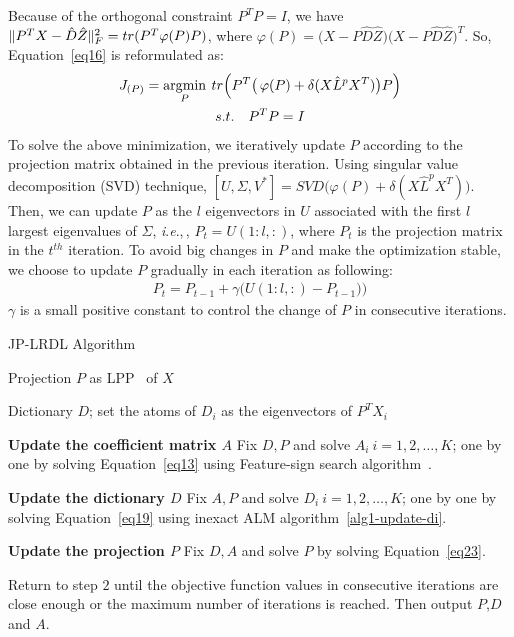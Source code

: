 \documentclass[journal]{IEEEtran}
\makeatletter
\newcommand{\ie}{\textit{i}.\textit{e}.,\,}
\def\NoNumber#1{{\def\alglinenumber##1{}\State #1}\addtocounter{ALG@line}{-1}}
\DeclareMathOperator*{\argmin}{\arg\!\min}
\DeclarePairedDelimiter\norm{\lVert}{\rVert}
\makeatother
\begin{document}
Because of the orthogonal constraint $P^T P = I$, we have $\norm{P^T X - \hat{D} \hat{Z}}_{F}^2 = tr(P^T \varphi(P) P) $, where $\varphi(P) = \big( X - P \hat{D} \hat{Z} \big) \big( X - P \hat{D} \hat{Z} \big)^T $. So, Equation~\eqref{eq16} is reformulated as:
\begin{gather}
J_{(P)} = \argmin_{P}  \> tr \Big( P^T \big( \, \varphi(P)+ \delta (X \hat{L}^{p} X^T) \big) P \Big) 
\label{eq22} \\ \notag
s.t. \quad P^T P = I
\end{gather}
To solve the above minimization, we iteratively update $P$ according to the projection matrix obtained in the previous iteration. Using singular value decomposition (SVD) technique, $[U,\Sigma,V^*] =  SVD \big( \varphi(P)+ \delta (X \hat{L}^{p} X^T) \big)$. Then, we can update $P$ as the $l$ eigenvectors in $U$ associated with the first $l$ largest eigenvalues of $\Sigma$, \ie, $P_t = U(1:l,:)$,  where $P_t$ is the projection matrix in the $t^{th}$ iteration. To avoid big changes in $P$ and make the optimization stable, we choose to update $P$ gradually in each iteration as following:
\begin{gather}
P_t =  P_{t-1} + \gamma \Big( U(1:l,:) - P_{t-1}) \Big) 
\label{eq23}
\end{gather}
$\gamma$ is a small positive constant to control the change of $P$ in consecutive iterations.
\begin{algorithm}[h]
\footnotesize
\caption{JP-LRDL Algorithm}
\label{alg2-whole}
\begin{algorithmic}[1]
\renewcommand{\algorithmicrequire}{\textbf{Input:}}
\Initialize 
\NoNumber{Projection $P$ as LPP~\cite{LPP} of $X$}
\NoNumber{Dictionary $D$; set the atoms of $D_i$ as the eigenvectors of $P^T X_i$}
    \vspace{1mm}    
    \State \textbf{Update the coefficient matrix $A$} 
    \vspace{1mm}
    \NoNumber{Fix $D,P$ and solve $A_i \> i=1,2, \dots, K$; one by one by solving Equation~\eqref{eq13} using Feature-sign search algorithm~\cite{Feature-Sign}.}
    \vspace{2mm}
    \State \textbf{Update the dictionary $D$} 
    \NoNumber{Fix $A,P$ and solve $D_i \> i=1,2, \dots, K$; one by one by solving Equation~\eqref{eq19} using inexact ALM algorithm~\ref{alg1-update-di}.}
    \vspace{2mm}
    \State \textbf{Update the projection $P$} 
    \NoNumber{Fix $D,A$ and solve $P$ by solving Equation~\eqref{eq23}.}
    \vspace{2mm}    
    \Output 
    \NoNumber{Return to step $2$ until the objective function values in consecutive iterations are close enough or the maximum number of iterations is reached. Then output $P$,$D$ and $A$.}
\end{algorithmic}
\end{algorithm}
\end{document}
